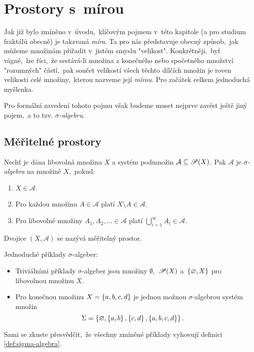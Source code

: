 \section{Prostory s~mírou}\label{sec:prostory-s-mirou}

Jak již bylo zmíněno v~úvodu,~klíčovým pojmem v~této kapitole (a pro studium fraktálů obecně) je takzvaná \emph{míra}. Ta pro nás představuje obecný způsob,~jak můžeme množinám přiřadit v~jistém smyslu "velikost". Konkrétněji,~byť vágně,~lze říci,~že sestává-li množina z konečného nebo spočetného množství "rozumných" částí,~pak součet velikostí všech těchto dílčích množin je roven velikosti celé množiny,~kterou nazveme její \emph{mírou}. Pro začátek celkem jednoduchá myšlenka.

Pro formální zavedení tohoto pojmu však budeme muset nejprve zavést ještě jiný pojem,~a to tzv. \emph{$\sigma$-algebru}.

\subsection{Měřitelné prostory}\label{subsec:meritelne-prostory}

\begin{definition}\label{def:sigma-algebra}
    Nechť je dána libovolná množina $X$ a systém podmnožin $\mathcal{A}\subseteq\mathscr{P}(X)$. Pak $\mathcal{A}$ je \emph{$\sigma$-algebra} na množině $X$,~pokud:
    \begin{enumerate}[label=(\alph*)]
        \item\label{def:sigma-algebra-podm1} $X\in\mathcal{A}$.
        \item\label{def:sigma-algebra-podm2} Pro každou množinu $A\in\mathcal{A}$ platí $X\setminus A\in\mathcal{A}$.
        \item\label{def:sigma-algebra-podm3} Pro libovolné množiny $A_1,A_2,\ldots\in\mathcal{A}$ platí $\bigcup_{i=1}^\infty A_i\in\mathcal{A}$.
    \end{enumerate}
    Dvojice $(X,\mathcal{A})$ se nazývá měřitelný prostor.
\end{definition}

\begin{example}
    Jednoduché příklady $\sigma$-algeber:
    \begin{itemize}
        \item Triviálními příklady $\sigma$-algeber jsou množiny $\emptyset$,~$\mathscr{P}(X)$ a~$\left\{\varnothing,X\right\}$ pro libovolnou množinu $X$.
        \item Pro konečnou množinu $X=\left\{a,b,c,d\right\}$ je jednou možnou $\sigma$-algebrou systém množin
        \[\Sigma=\left\{\varnothing,\left\{a,b\right\},\left\{c,d\right\},\left\{a,b,c,d\right\}\right\}.\]
    \end{itemize}
    Sami se zkuste přesvědčit,~že všechny zmíněné příklady vyhovují definici \ref{def:sigma-algebra}.
\end{example}


